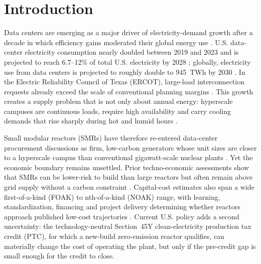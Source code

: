 \documentclass[sn-vancouver,Numbered]{sn-jnl}%
\begin{document}
\linenumbers

\section{Introduction}
\label{sec:introduction}

Data centers are emerging as a major driver of electricity-demand growth after a decade in which efficiency gains moderated their global energy use \citep{masanet2020datacenter}. U.S. data-center electricity consumption nearly doubled between 2019 and 2023 and is projected to reach 6.7--12\% of total U.S. electricity by 2028 \citep{shehabi2024}; globally, electricity use from data centers is projected to roughly double to 945~TWh by 2030 \citep{iea2024electricity,iea2025energyAi}. In the Electric Reliability Council of Texas (ERCOT), large-load interconnection requests already exceed the scale of conventional planning margins \citep{ercot2025longterm,eia2026aeo}. This growth creates a supply problem that is not only about annual energy: hyperscale campuses are continuous loads, require high availability and carry cooling demands that rise sharply during hot and humid hours \citep{greenGrid2012pue,ashrae2021thermal}.

Small modular reactors (SMRs) have therefore re-entered data-center procurement discussions as firm, low-carbon generators whose unit sizes are closer to a hyperscale campus than conventional gigawatt-scale nuclear plants \citep{mignacca2020smrFinance,doe2024liftoff,atb2024nuclear,asuega2023}. Yet the economic boundary remains unsettled. Prior techno-economic assessments show that SMRs can be lower-risk to build than large reactors but often remain above grid supply without a carbon constraint \citep{asuega2023}. Capital-cost estimates also span a wide first-of-a-kind (FOAK) to nth-of-a-kind (NOAK) range, with learning, standardization, financing and project delivery determining whether reactors approach published low-cost trajectories \citep{inl2024metaanalysis,nea2020constructionCost,atb2024nuclear}. Current U.S. policy adds a second uncertainty: the technology-neutral Section~45Y clean-electricity production tax credit (PTC), for which a new-build zero-emission reactor qualifies, can materially change the cost of operating the plant, but only if the pre-credit gap is small enough for the credit to close.
\end{document}
